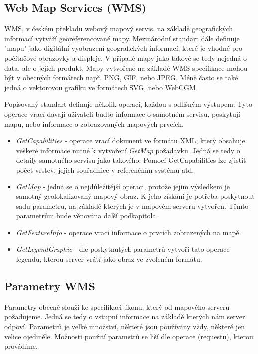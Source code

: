 \subsection{Web Map Services (WMS)}

WMS, v českém překladu webový mapový servis, na základě geografických
informací vytváří georeferencované mapy. Mezinárodní standart dále
definuje "mapu" jako digitální vyobrazení geografických informací,
které je vhodné pro počítačové obrazovky a displeje. V případě mapy
jako takové se tedy nejedná o data, ale o jejich produkt. Mapy
vytvořené na základě WMS specifikace mohou být v obecných formátech
např. PNG, GIF, nebo JPEG. Méně často se také jedná o vektorovou
grafiku ve formátech SVG, nebo WebCGM \cite{oqc_wms}.

Popisovaný standart definuje několik operací, každou s odlišným
výstupem. Tyto operace vrací dávají uživateli buďto informace o
samotném servisu, poskytují mapu, nebo informace o zobrazovaných
mapových prvcích.

\begin{itemize}

\item\textit{GetCapabilities} - operace vrací dokument ve formátu XML,
  který obsahuje veškeré informace nutné k vytvoření \textit{GetMap}
  požadavku. Jedná se tedy o detaily samotného servisu jako
  takového. Pomocí GetCapabilities lze zjistit počet vrstev, jejich
  souřadnice v referenčním systému atd.
	
\item\textit{GetMap} - jedná se o nejdůležitější operaci, protože
  jejím výsledkem je samotný geolokalizovaný mapový obraz. K jeho
  získání je potřeba poskytnout sadu parametrů, na základě kterých je
  v mapovém serveru vytvořen. Těmto parametrům bude věnována další
  podkapitola.
	
\item\textit{GetFeatureInfo} - operace vrací informace o prvcích
  zobrazených na mapě.
	
\item\textit{GetLegendGraphic} - dle poskytnutých parametrů vytvoří
  tato operace legendu, kterou server vrátí jako obraz ve zvoleném
  formátu.
\end{itemize}

\subsection{Parametry WMS}

Parametry obecně slouží ke specifikaci úkonu, který od mapového
serveru požadujeme. Jedná se tedy o vstupní informace na základě
kterých nám server odpoví. Parametrů je velké množství, některé jsou
používány vždy, některé jen velice ojediněle. Možnosti použití
parametrů se liší dle operace (requestu), kterou provádíme.

